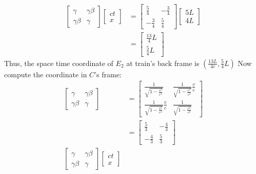 \documentclass{article}
\begin{document}
\begin{itemize}
\begin{align*}
        \begin{bmatrix}
            \gamma&\gamma\beta\\
            \gamma\beta&\gamma
        \end{bmatrix}\begin{bmatrix}
            ct\\x
        \end{bmatrix}&=\begin{bmatrix}
            \frac{5}{4}&-\frac{3}{4}\\
            -\frac{3}{4}&\frac{5}{4}
        \end{bmatrix}\begin{bmatrix}
            5L\\4L
        \end{bmatrix}\\
        &=\begin{bmatrix}
            \frac{13}{4}L\\\frac{5}{4}L
        \end{bmatrix}
    \end{align*}
    Thus, the space time coordinate of \(E_2\) at train's back frame is \(\left(\frac{13L}{4c},\frac{5}{4}L\right)\) 
    Now compute the coordinate in \(C\)'s frame:
    \begin{align*}
        \begin{bmatrix}
            \gamma&\gamma\beta\\
            \gamma\beta&\gamma
        \end{bmatrix}&=
        \begin{bmatrix}
            \frac{1}{\sqrt{1-\frac{v^2}{c^2}}}&\frac{1}{\sqrt{1-\frac{v^2}{c^2}}}\frac{v}{c}\\
            \frac{1}{\sqrt{1-\frac{v^2}{c^2}}}\frac{v}{c}&\frac{1}{\sqrt{1-\frac{v^2}{c^2}}}
        \end{bmatrix}\\
        &=\begin{bmatrix}
            \frac{5}{3}&-\frac{4}{3}\\
            -\frac{4}{3}&\frac{5}{3}
        \end{bmatrix}\\
        \begin{bmatrix}
            \gamma&\gamma\beta\\
            \gamma\beta&\gamma
        \end{bmatrix}\begin{bmatrix}
            ct\\x

\end{bmatrix}
\end{align*}
\end{itemize}
\end{document}

